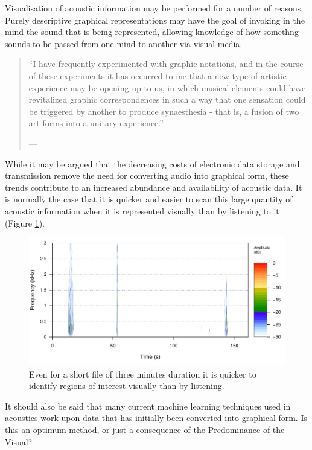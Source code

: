 \documentclass[
]{book}
\begin{document}
Visualisation of acoustic information may be performed for a number of reasons. Purely descriptive graphical representations may have the goal of invoking in the mind the sound that is being represented, allowing knowledge of how somethng sounds to be passed from one mind to another via visual media.

\begin{quote}
``I have frequently experimented with graphic notations, and in the course of these experiments it has occurred to me that a new type of artistic experience may be opening up to us, in which musical clements could have revitalized graphic correspondences in such a way that one sensation could be triggered by another to produce synaesthesia - that is, a fusion of two art forms into a unitary experience.''

\hfill --- \citep{schafer1975}
\end{quote}

While it may be argued that the decreasing costs of electronic data storage and transmission remove the need for converting audio into graphical form, these trends contribute to an increased abundance and availability of acoustic data. It is normally the case that it is quicker and easier to scan this large quantity of acoustic information when it is represented visually than by listening to it (Figure \ref{fig:quicker-visually}).

\begin{figure}

{\centering \includegraphics[width=0.9\linewidth]{_main_files/figure-latex/quicker-visually-1} 

}

\caption{Even for a short file of three minutes duration it is quicker to identify regions of interest visually than by listening.}\label{fig:quicker-visually}
\end{figure}

It should also be said that many current machine learning techniques used in acoustics work upon data that has initially been converted into graphical form. Is this an optimum method, or just a consequence of the Predominance of the Visual?
\end{document}
